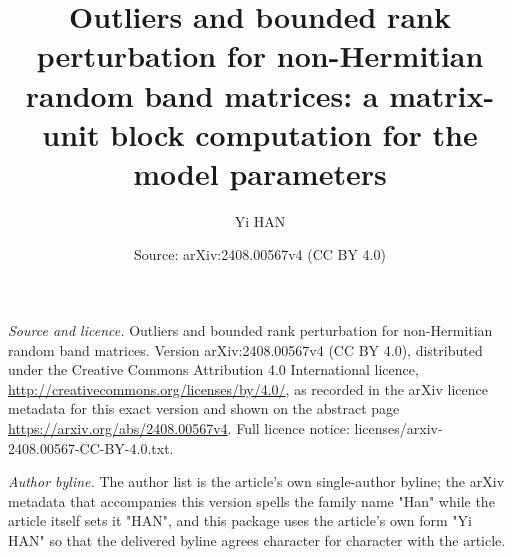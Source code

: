 \documentclass[10pt,a4paper]{amsart}
\title[Non-Hermitian band matrices]{Outliers and bounded rank perturbation for non-Hermitian random band matrices: a matrix-unit block computation for the model parameters}
\author{Yi HAN}
\date{Source: arXiv:2408.00567v4 (CC BY 4.0)}
\theoremstyle{plain}
\theoremstyle{remark}
\begin{document}
\maketitle
\noindent\emph{Source and licence.} Outliers and bounded rank perturbation for non-Hermitian random band matrices. Version arXiv:2408.00567v4 (CC BY 4.0), distributed under the Creative Commons Attribution 4.0 International licence, \url{http://creativecommons.org/licenses/by/4.0/}, as recorded in the arXiv licence metadata for this exact version and shown on the abstract page \url{https://arxiv.org/abs/2408.00567v4}. Full licence notice: licenses/arxiv-2408.00567-CC-BY-4.0.txt.\par\smallskip

\noindent\textit{Author byline.} The author list is the article's own single-author byline; the arXiv metadata that accompanies this version spells the family name "Han" while the article itself sets it "HAN", and this package uses the article's own form "Yi HAN" so that the delivered byline agrees character for character with the article.\par\smallskip
\end{document}
